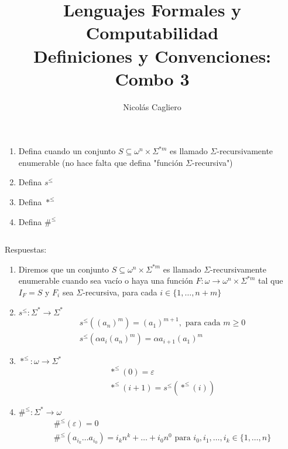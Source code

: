 \documentclass{article}
\title{Lenguajes Formales y Computabilidad \\
        \large Definiciones y Convenciones: Combo 3 }
\author{Nicolás Cagliero}
\begin{document}
\maketitle

\begin{enumerate}
    \item Defina cuando un conjunto $S \subseteq \omega^n \times \Sigma^{*m}$ 
    es llamado $\Sigma$-recursivamente enumerable (no hace falta que defina "función $\Sigma$-recursiva")

    \item Defina $s^{\leq}$
    
    \item Defina $*^{\leq}$
    
    \item Defina $\#^{\leq}$
\end{enumerate}
\(\)
\begin{center}
    Respuestas: 
    \(\)
\end{center}

\begin{enumerate}
    \item Diremos que un conjunto  $S \subseteq \omega^n \times \Sigma^{*m}$ 
    es llamado $\Sigma$-recursivamente enumerable cuando sea vacío o haya
    una función $F : \omega \rightarrow \omega^{n} \times \Sigma^{*m}$
    tal que $I_F = S$ y $F_i$ sea $\Sigma$-recursiva, para cada
    $i \in \{1, \dots, n+m\}$

    \item $s^{\leq} : \Sigma^{*} \rightarrow \Sigma^{*}$
    \begin{align*}
        &s^{\leq}((a_n)^{m}) = (a_1)^{m+1}, \text{ para cada } m \geq 0 \\
        &s^{\leq}(\alpha a_i(a_n)^{m}) = \alpha a_{i+1}(a_1)^{m}
    \end{align*}

    \item $*^{\leq} : \omega \rightarrow \Sigma^{*}$
    \begin{align*}
        &*^{\leq}(0) = \varepsilon \\
        &*^{\leq}(i + 1) = s^{\leq}(*^{\leq}(i))
    \end{align*}

    \item $\#^{\leq} : \Sigma^{*} \rightarrow \omega$
    \begin{align*}
        &\#^{\leq}(\varepsilon) = 0 \\
        &\#^{\leq}(a_{i_k} \dots a_{i_0}) = i_k n^k + \dots + i_0 n^0 
        \text{ para } i_0, i_1, \dots, i_k \in \{1, \dots, n\}
    \end{align*}
\end{enumerate}
\end{document}
